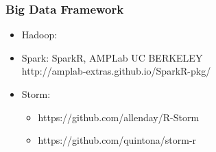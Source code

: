 \documentclass[UTF8]{beamer}\usepackage[]{graphicx}\usepackage[]{color}
\begin{document}
\begin{frame}
  \frametitle{Big Data Framework}
  \begin{itemize}
    \item Hadoop:
    \item Spark: SparkR, AMPLab UC BERKELEY\\
    http://amplab-extras.github.io/SparkR-pkg/
    \item Storm:
    \begin{itemize}
      \item https://github.com/allenday/R-Storm
      \item https://github.com/quintona/storm-r
    \end{itemize}
  \end{itemize}
\end{frame}
\end{document}
